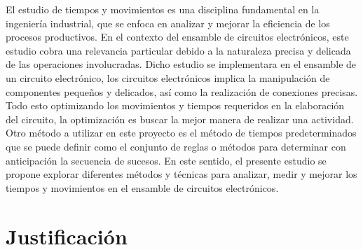      El estudio de tiempos y movimientos es una disciplina fundamental en la ingeniería industrial, que se enfoca en analizar y mejorar la eficiencia de los procesos productivos. En el contexto del ensamble de circuitos electrónicos, este estudio cobra una relevancia particular debido a la naturaleza precisa y delicada de las operaciones involucradas.
     Dicho estudio se implementara en el ensamble de un circuito electrónico, los circuitos electrónicos implica la manipulación de componentes pequeños y delicados, así como la realización de conexiones precisas. Todo esto optimizando los movimientos y tiempos requeridos en la elaboración del circuito, la optimización es buscar la mejor manera de realizar una actividad.\cite{RAE}  
     Otro método a utilizar en este proyecto es el método de tiempos predeterminados que se puede definir como el conjunto de reglas o métodos para determinar con anticipación la secuencia de sucesos. En este sentido, el presente estudio se propone explorar diferentes métodos y técnicas para analizar, medir y mejorar los tiempos y movimientos en el ensamble de circuitos electrónicos.
    \section{Justificación}
    
